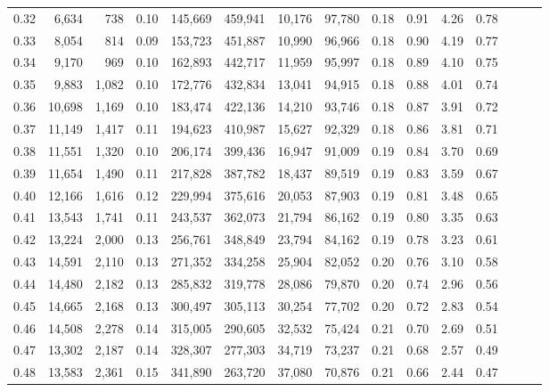 \begin{tabular}{rrrrrrrrrrrrrrr}
0.32 &   6,634 &    738 &  0.10 &  145,669 &  459,941 &   10,176 &   97,780 &  0.18 &  0.91 &  4.26 &      0.78 \\
0.33 &   8,054 &    814 &  0.09 &  153,723 &  451,887 &   10,990 &   96,966 &  0.18 &  0.90 &  4.19 &      0.77 \\
0.34 &   9,170 &    969 &  0.10 &  162,893 &  442,717 &   11,959 &   95,997 &  0.18 &  0.89 &  4.10 &      0.75 \\
0.35 &   9,883 &  1,082 &  0.10 &  172,776 &  432,834 &   13,041 &   94,915 &  0.18 &  0.88 &  4.01 &      0.74 \\
0.36 &  10,698 &  1,169 &  0.10 &  183,474 &  422,136 &   14,210 &   93,746 &  0.18 &  0.87 &  3.91 &      0.72 \\
0.37 &  11,149 &  1,417 &  0.11 &  194,623 &  410,987 &   15,627 &   92,329 &  0.18 &  0.86 &  3.81 &      0.71 \\
0.38 &  11,551 &  1,320 &  0.10 &  206,174 &  399,436 &   16,947 &   91,009 &  0.19 &  0.84 &  3.70 &      0.69 \\
0.39 &  11,654 &  1,490 &  0.11 &  217,828 &  387,782 &   18,437 &   89,519 &  0.19 &  0.83 &  3.59 &      0.67 \\
0.40 &  12,166 &  1,616 &  0.12 &  229,994 &  375,616 &   20,053 &   87,903 &  0.19 &  0.81 &  3.48 &      0.65 \\
0.41 &  13,543 &  1,741 &  0.11 &  243,537 &  362,073 &   21,794 &   86,162 &  0.19 &  0.80 &  3.35 &      0.63 \\
0.42 &  13,224 &  2,000 &  0.13 &  256,761 &  348,849 &   23,794 &   84,162 &  0.19 &  0.78 &  3.23 &      0.61 \\
0.43 &  14,591 &  2,110 &  0.13 &  271,352 &  334,258 &   25,904 &   82,052 &  0.20 &  0.76 &  3.10 &      0.58 \\
0.44 &  14,480 &  2,182 &  0.13 &  285,832 &  319,778 &   28,086 &   79,870 &  0.20 &  0.74 &  2.96 &      0.56 \\
0.45 &  14,665 &  2,168 &  0.13 &  300,497 &  305,113 &   30,254 &   77,702 &  0.20 &  0.72 &  2.83 &      0.54 \\
0.46 &  14,508 &  2,278 &  0.14 &  315,005 &  290,605 &   32,532 &   75,424 &  0.21 &  0.70 &  2.69 &      0.51 \\
0.47 &  13,302 &  2,187 &  0.14 &  328,307 &  277,303 &   34,719 &   73,237 &  0.21 &  0.68 &  2.57 &      0.49 \\
0.48 &  13,583 &  2,361 &  0.15 &  341,890 &  263,720 &   37,080 &   70,876 &  0.21 &  0.66 &  2.44 &      0.47 \\

\end{tabular}

